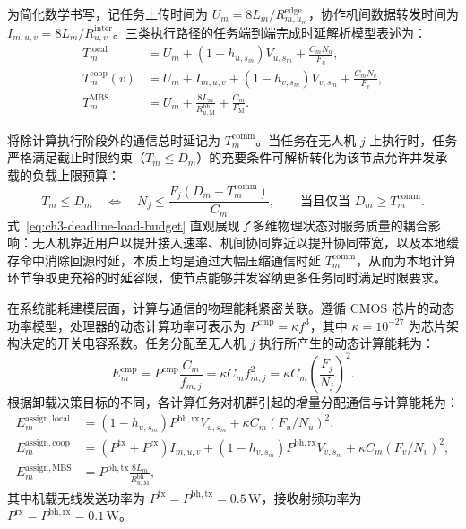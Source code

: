 为简化数学书写，记任务上传时间为 $U_m = 8L_m / R^{\mathrm{edge}}_{m,u_m}$，协作机间数据转发时间为 $I_{m,u,v} = 8L_m / R^{\mathrm{inter}}_{u,v}$。三类执行路径的任务端到端完成时延解析模型表述为：
\begin{equation}
    \begin{aligned}
    T_m^{\mathrm{local}} &= U_m + (1 - h_{u,s_m}) V_{u,s_m} + \frac{C_m N_u}{F_u},\\
    T_m^{\mathrm{coop}}(v) &= U_m + I_{m,u,v} + (1 - h_{v,s_m}) V_{v,s_m} + \frac{C_m N_v}{F_v},\\
    T_m^{\mathrm{MBS}} &= U_m + \frac{8L_m}{R^{\mathrm{bh}}_{u,\mathrm M}} + \frac{C_m}{F_{\mathrm M}}.
    \end{aligned}
    \label{eq:ch3-service-three-paths}
\end{equation}

将除计算执行阶段外的通信总时延记为 $T_m^{\mathrm{comm}}$。当任务在无人机 $j$ 上执行时，任务严格满足截止时限约束（$T_m \leq D_m$）的充要条件可解析转化为该节点允许并发承载的负载上限预算：
\begin{equation}
    T_m \leq D_m \quad \Longleftrightarrow \quad 
    N_j \leq \frac{F_j(D_m - T_m^{\mathrm{comm}})}{C_m}, \qquad \text{当且仅当 } D_m \geq T_m^{\mathrm{comm}}.
    \label{eq:ch3-deadline-load-budget}
\end{equation}
式~\eqref{eq:ch3-deadline-load-budget} 直观展现了多维物理状态对服务质量的耦合影响：无人机靠近用户以提升接入速率、机间协同靠近以提升协同带宽，以及本地缓存命中消除回源时延，本质上均是通过大幅压缩通信时延 $T_m^{\mathrm{comm}}$，从而为本地计算环节争取更充裕的时延容限，使节点能够并发容纳更多任务同时满足时限要求。

在系统能耗建模层面，计算与通信的物理能耗紧密关联。遵循 CMOS 芯片的动态功率模型，处理器的动态计算功率可表示为 $P^{\mathrm{cmp}} = \kappa f^3$，其中 $\kappa=10^{-27}$ 为芯片架构决定的开关电容系数。任务分配至无人机 $j$ 执行所产生的动态计算能耗为：
\begin{equation}
    E_m^{\mathrm{cmp}} = P^{\mathrm{cmp}} \frac{C_m}{f_{m,j}} = \kappa C_m f_{m,j}^2 = \kappa C_m \left(\frac{F_j}{N_j}\right)^2.
    \label{eq:ch3-dynamic-compute-energy}
\end{equation}
根据卸载决策目标的不同，各计算任务对机群引起的增量分配通信与计算能耗为：
\begin{equation}
    \begin{aligned}
    E_m^{\mathrm{assign,local}} &= (1 - h_{u,s_m}) P^{\mathrm{bh,rx}} V_{u,s_m} + \kappa C_m (F_u / N_u)^2,\\
    E_m^{\mathrm{assign,coop}} &= (P^{\mathrm{tx}} + P^{\mathrm{rx}}) I_{m,u,v} + (1 - h_{v,s_m}) P^{\mathrm{bh,rx}} V_{v,s_m} + \kappa C_m (F_v / N_v)^2,\\
    E_m^{\mathrm{assign,MBS}} &= P^{\mathrm{bh,tx}} \frac{8L_m}{R^{\mathrm{bh}}_{u,\mathrm M}},
    \end{aligned}
    \label{eq:ch3-assignment-energy-paths}
\end{equation}
其中机载无线发送功率为 $P^{\mathrm{tx}} = P^{\mathrm{bh,tx}} = 0.5\,\mathrm{W}$，接收射频功率为 $P^{\mathrm{rx}} = P^{\mathrm{bh,rx}} = 0.1\,\mathrm{W}$。

